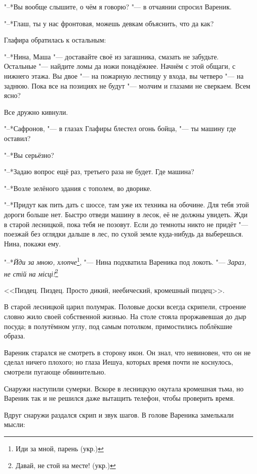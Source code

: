 "--*Вы вообще слышите, о чём я говорю? "--- в отчаянии спросил Вареник.

"--*Глаш, ты у нас фронтовая, можешь девкам объяснить, что да как?

Глафира обратилась к остальным:

"--*Нина, Маша "--- доставайте своё из загашника, смазать не забудьте.
Остальные "--- найдите ломы да ножи понадёжнее.
Начнём с этой общаги, с нижнего этажа.
Вы двое "--- на пожарную лестницу у входа, вы четверо "--- на заднюю.
Пока все на позициях не будут "--- молчим и глазами не сверкаем.
Всем ясно?

Все дружно кивнули.

"--*Сафронов, "--- в глазах Глафиры блестел огонь бойца, "--- ты машину где оставил?

"--*Вы серьёзно?

"--*Задаю вопрос ещё раз, третьего раза не будет.
Где машина?

"--*Возле зелёного здания с тополем, во дворике.

"--*Придут как пить дать с шоссе, там уже их техника на обочине.
Для тебя этой дороги больше нет.
Быстро отведи машину в лесок, её не должны увидеть.
Жди в старой лесницкой, пока тебя не позовут.
Если до темноты никто не придёт "--- поезжай без оглядки дальше в лес, по сухой земле куда-нибудь да выберешься.
Нина, покажи ему.

"--*\textit{Йди за мною, хлопче}\footnote{Иди за мной, парень (укр.)}, "--- Нина подхватила Вареника под локоть.
"--- \textit{Зараз, не стій на місці!}\footnote{Давай, не стой на месте! (укр.)}

\asterism

<<Пиздец.
Пиздец.
Просто дикий, неебический, кромешный пиздец>>.

В старой лесницкой царил полумрак.
Половые доски всегда скрипели, строение словно жило своей собственной жизнью.
На столе стояла проржавевшая до дыр посуда;
в полутёмном углу, под самым потолком, примостились поблёкшие образа.

Вареник старался не смотреть в сторону икон.
Он знал, что невиновен, что он не сделал ничего плохого;
но глаза Иешуа, которых время почти не коснулось, смотрели пугающе обвинительно.

Снаружи наступили сумерки.
Вскоре в лесницкую окутала кромешная тьма, но Вареник так и не решился даже вытащить телефон, чтобы проверить время.

Вдруг снаружи раздался скрип и звук шагов.
В голове Вареника замелькали мысли:

